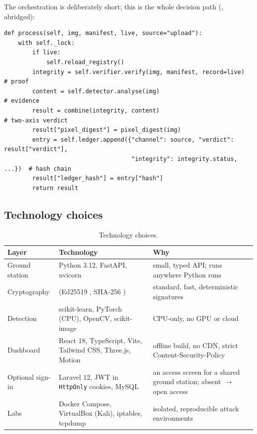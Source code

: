 The orchestration is deliberately short; this is the whole decision path (, abridged):
\begin{lstlisting}[style=py]
def process(self, img, manifest, live, source="upload"):
    with self._lock:
        if live:
            self.reload_registry()
        integrity = self.verifier.verify(img, manifest, record=live)  # proof
        content = self.detector.analyse(img)                          # evidence
        result = combine(integrity, content)                          # two-axis verdict
        result["pixel_digest"] = pixel_digest(img)
        entry = self.ledger.append({"channel": source, "verdict": result["verdict"],
                                    "integrity": integrity.status, ...})  # hash chain
        result["ledger_hash"] = entry["hash"]
        return result
\end{lstlisting}

\subsection{Technology choices}
\begin{table}[!htbp]
\centering\small
\begin{tabularx}{\textwidth}{|L{2.6cm}|L{6cm}|Y|}
\hline
\textbf{Layer} & \textbf{Technology} & \textbf{Why}\\
\hline
Ground station & Python 3.12, FastAPI, uvicorn & small, typed API; runs anywhere Python runs\\
\hline
Cryptography &  (Ed25519 \cite{rfc8032}, SHA-256 \cite{fips180}) & standard, fast, deterministic signatures\\
\hline
Detection & scikit-learn, PyTorch (CPU), OpenCV, scikit-image & CPU-only, no GPU or cloud\\
\hline
Dashboard & React 18, TypeScript, Vite, Tailwind CSS, Three.js, Motion & offline build, no CDN, strict Content-Security-Policy\\
\hline
Optional sign-in & Laravel 12, JWT in \texttt{HttpOnly} cookies, MySQL & an access screen for a shared ground station; absent $\to$ open access\\
\hline
Labs & Docker Compose, VirtualBox (Kali), iptables, tcpdump & isolated, reproducible attack environments\\
\hline
\end{tabularx}
\caption{Technology choices.}
\end{table}
